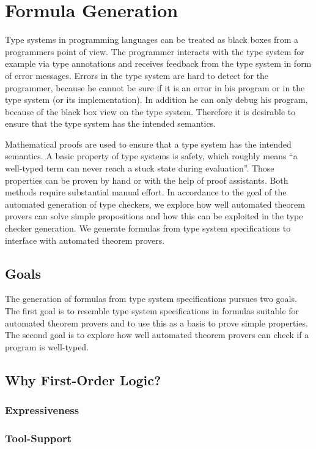 \chapter{Formula Generation}
\label{ch:formula-generation}
Type systems in programming languages can be treated as black boxes
from a programmers point of view. The programmer interacts with the
type system for example via type annotations and receives feedback
from the type system in form of error messages. Errors in the type
system are hard to detect for the programmer, because he cannot be
sure if it is an error in his program or in the type system (or its
implementation). In addition he can only debug his program, because of
the black box view on the type system. Therefore it is desirable to
ensure that the type system has the intended semantics.

Mathematical proofs are used to ensure that a type system has the
intended semantics. A basic property of type systems is safety, which
roughly means ``a well-typed term can never reach a stuck state during
evaluation''\cite{Pierce:2002:TPL:509043}. Those properties can be
proven by hand or with the help of proof assistants. Both methods
require substantial manual effort. In accordance to the goal of the
automated generation of type checkers, we explore how well automated
theorem provers can solve simple propositions and how this can be
exploited in the type checker generation. We generate formulas from
type system specifications to interface with automated theorem
provers.
 
\section{Goals}
The generation of formulas from type system specifications pursues two
goals. The first goal is to resemble type system specifications in
formulas suitable for automated theorem provers and to use this as a
basis to prove simple properties. The second goal is to explore how
well automated theorem provers can check if a program is well-typed.

\section{Why First-Order Logic?}
\subsection{Expressiveness}
\subsection{Tool-Support}
